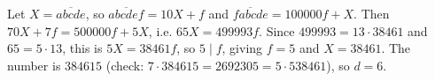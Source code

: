 Let $X=\overline{abcde}$, so $\overline{abcdef}=10X+f$ and $\overline{fabcde}=100000f+X$. Then $70X+7f=500000f+5X$, i.e. $65X=499993f$. Since $499993=13\cdot38461$ and $65=5\cdot13$, this is $5X=38461f$, so $5\mid f$, giving $f=5$ and $X=38461$. The number is $384615$ (check: $7\cdot384615=2692305=5\cdot538461$), so $d=\boxed{6}$.
